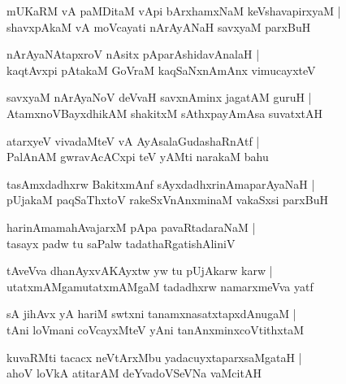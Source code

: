 \documentclass[twoside,12pt,openright]{book}
\newcounter{shloka}[chapter]
\begin{document}
\begin{shloka}
mUKaRM vA paMDitaM vApi bArxhamxNaM keVshavapirxyaM |\\
shavxpAkaM vA moVcayati nArAyANaH savxyaM parxBuH 
\end{shloka}

\begin{shloka}
nArAyaNAtapxroV nAsitx pAparAshidavAnalaH |\\
kaqtAvxpi pAtakaM GoVraM kaqSaNxnAmAnx vimucayxteV
\end{shloka}

\begin{shloka}
savxyaM nArAyaNoV deVvaH savxnAminx jagatAM guruH |\\
AtamxnoVBayxdhikAM shakitxM sAthxpayAmAsa suvatxtAH 
\end{shloka}

\begin{shloka}
atarxyeV vivadaMteV vA AyAsalaGudashaRnAtf |\\
PalAnAM gwravAcACxpi teV yAMti narakaM bahu 
\end{shloka}

\begin{shloka}
tasAmxdadhxrw BakitxmAnf sAyxdadhxrinAmaparAyaNaH |\\
pUjakaM paqSaThxtoV rakeSxVnAnxminaM vakaSxsi parxBuH 
\end{shloka}

\begin{shloka}
harinAmamahAvajarxM pApa pavaRtadaraNaM |\\
tasayx padw tu saPalw tadathaRgatishAliniV 
\end{shloka}

\begin{shloka}
tAveVva dhanAyxvAKAyxtw yw tu pUjAkarw karw |\\
utatxmAMgamutatxmAMgaM tadadhxrw namarxmeVva yatf
\end{shloka}

\begin{shloka}
sA jihAvx yA hariM swtxni tanamxnasatxtapxdAnugaM |\\
tAni loVmani coVcayxMteV yAni tanAnxminxcoVtithxtaM 
\end{shloka}

\begin{shloka}
kuvaRMti tacacx neVtArxMbu yadacuyxtaparxsaMgataH |\\
ahoV loVkA atitarAM deYvadoVSeVNa vaMcitAH 
\end{shloka}
\end{document}
